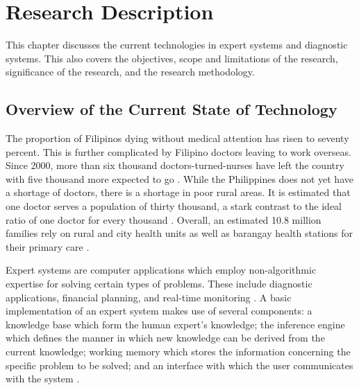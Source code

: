 %
%
%                 

\chapter{Research Description}
\label{sec:researchdesc}    %
This chapter discusses the current technologies in expert systems and diagnostic systems.
This also covers the objectives, scope and limitations of the research, significance of the research, and the research methodology.

\section{Overview of the Current State of Technology}
\label{sec:overview}
The proportion of Filipinos dying without medical attention has risen to seventy percent.
This is further complicated by Filipino doctors leaving to work overseas.
Since 2000, more than six thousand doctors-turned-nurses have left the country with five thousand more expected to go \cite{Harden:2008}.
While the Philippines does not yet have a shortage of doctors, there is a shortage in poor rural areas.
It is estimated that one doctor serves a population of thirty thousand, a stark contrast to the ideal ratio of one doctor for every thousand \cite{Manongdo:2014}.
Overall, an estimated 10.8 million families rely on rural and city health units as well as barangay health stations for their primary care \cite{gmc:2013}.

Expert systems are computer applications which employ non-algorithmic expertise for solving certain types of problems.
 These include diagnostic applications, financial planning, and real-time monitoring \cite{Merritt:2010}.
A basic implementation of an expert system makes use of several components:
a knowledge base which form the human expert's knowledge; 
the inference engine which defines the manner in which new knowledge can be derived from the current knowledge; 
working memory which stores the information concerning the specific problem to be solved; 
and an interface with which the user communicates with the system \cite{Agarwal:2014}. 


